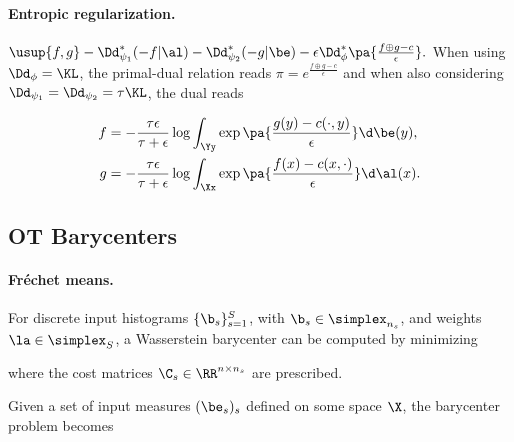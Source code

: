 \paragraph{Entropic regularization.}
\(\usup{f,g} - \Dd_{\psi_1}^*(-f|\al) - \Dd_{\psi_2}^*(-g|\be) - \epsilon \Dd_\phi^*\pa{ \frac{f\oplus g-c}{\epsilon} }.\)
When using $\Dd_\phi=\KL$, the primal-dual relation reads $\pi=e^{\frac{f\oplus g - c}{\epsilon}}$ and when also considering $\Dd_{\psi_1}=\Dd_{\psi_2} = \tau \KL$, the dual reads

\begin{align*}
f &= -\frac{\tau\epsilon}{\tau+\epsilon} \log\int_\Yy \exp\pa{ \frac{g(y) - c(\cdot,y)}{\epsilon} } \d\be(y), \\
g &= -\frac{\tau\epsilon}{\tau+\epsilon} \log\int_\Xx \exp\pa{ \frac{f(x) - c(x,\cdot)}{\epsilon} } \d\al(x). \\
\end{align*}
\subsection{OT Barycenters}
\label{sec-barycenters}
\paragraph{Fr\'echet means.}
For discrete input histograms $\{\b_s\}_{s=1}^S$, with $\b_s \in \simplex_{n_s}$, and weights $\la \in \simplex_S$, a Wasserstein barycenter can be computed by minimizing

where the cost matrices $\C_s \in \RR^{n \times n_s}$ are prescribed.

Given a set of input measures $(\be_s)_s$ defined on some space $\X$, the barycenter problem becomes

